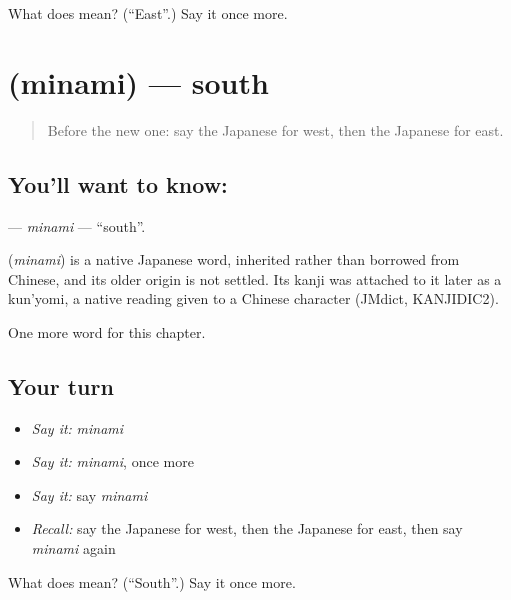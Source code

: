 \begin{tcolorbox}[breakable,colback=teal!4,colframe=teal!35!black,title={Before you move on}]
What does  mean? (\textquotedblleft{}East\textquotedblright{}.) Say it once more.
\end{tcolorbox}
\section[\texorpdfstring{\ja{みなみ} (minami)}{みなみ (minami)}]{ (minami) — south}

\label{lesson:JA-C63-minami}



\begin{quote}
Before the new one: say the Japanese for west, then the Japanese for east.
\end{quote}

\subsection*{You'll want to know: }
\textbf{} — \emph{minami} — \textquotedblleft{}south\textquotedblright{}.

\begin{cousinweb}
\textbf{} (\emph{minami}) is a native Japanese word, inherited rather than borrowed from Chinese, and its older origin is not settled. Its kanji was attached to it later as a kun'yomi, a native reading given to a Chinese character (JMdict, KANJIDIC2).
\end{cousinweb}

\begin{grammarlens}[title={What you've built}]
One more word for this chapter.
\end{grammarlens}

\subsection*{Your turn}
\begin{itemize}
\raggedright
  \item \emph{Say it:} \emph{minami}
  \item \emph{Say it:} \emph{minami}, once more
  \item \emph{Say it:} say \emph{minami}
  \item \emph{Recall:} say the Japanese for west, then the Japanese for east, then say \emph{minami} again
\end{itemize}

\begin{tcolorbox}[breakable,colback=teal!4,colframe=teal!35!black,title={Before you move on}]
What does  mean? (\textquotedblleft{}South\textquotedblright{}.) Say it once more.
\end{tcolorbox}
